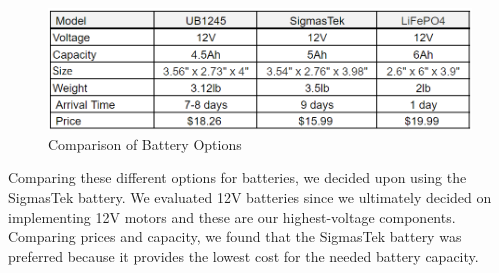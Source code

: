 \begin{figure}[H]
	\centering
	\includegraphics[width=1\textwidth]{./Images/battery_table.png}
	\caption{\label{fig:batteries}Comparison of Battery Options}
\end{figure}

\noindent Comparing these different options for batteries, we decided upon using the SigmasTek battery. We evaluated 12V batteries since we ultimately decided on implementing 12V motors and these are our highest-voltage components. Comparing prices and capacity, we found that the SigmasTek battery was preferred because it provides the lowest cost for the needed battery capacity. \cite{liftmaster2024} \cite{lifepo42024}\\
